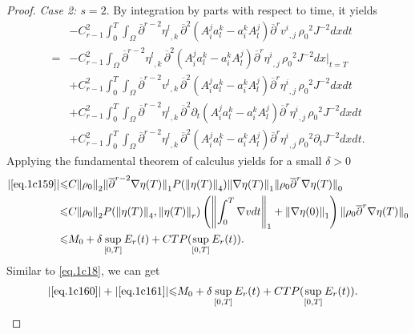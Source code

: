 \documentclass[12pt,twoside,reqno]{amsart}
\numberwithin{equation}{section}
\theoremstyle{definition}
\theoremstyle{remark}
\begin{document}
\begin{proof}
\emph{Case 2: $s=2$}. By integration by parts with respect to time, it yields
\begin{align}
  &-C_{r-1}^2{\int_0^T\!\!\!\!\int_\Omega }  {\overline{\partial}}^{r-2}{{{\eta^l}}_{,{k}}\,}{\overline{\partial}}^2(A^j_ia^k_l-a^k_iA^j_l){{{{\overline{\partial}}^r v^i}}_{,{j}}\,}{\rho_0}^2  J^{-2}dxdt\label{eq.1c158}\\
  =&-C_{r-1}^2\int_\Omega {\overline{\partial}}^{r-2}{{{\eta^l}}_{,{k}}\,}{\overline{\partial}}^2(A^j_ia^k_l-a^k_iA^j_l){{{{\overline{\partial}}^r \eta^i}}_{,{j}}\,}{\rho_0}^2  J^{-2}dx\Big|_{t=T}\label{eq.1c159}\\
  &+C_{r-1}^2{\int_0^T\!\!\!\!\int_\Omega }  {\overline{\partial}}^{r-2}{{{v^l}}_{,{k}}\,}{\overline{\partial}}^2(A^j_ia^k_l-a^k_iA^j_l){{{{\overline{\partial}}^r \eta^i}}_{,{j}}\,}{\rho_0}^2  J^{-2}dxdt\label{eq.1c160}\\
  &+C_{r-1}^2{\int_0^T\!\!\!\!\int_\Omega }  {\overline{\partial}}^{r-2}{{{\eta^l}}_{,{k}}\,}{\overline{\partial}}^2{\partial}_t(A^j_ia^k_l-a^k_iA^j_l){{{{\overline{\partial}}^r \eta^i}}_{,{j}}\,}{\rho_0}^2  J^{-2}dxdt\label{eq.1c161}\\
  &+C_{r-1}^2{\int_0^T\!\!\!\!\int_\Omega }  {\overline{\partial}}^{r-2}{{{\eta^l}}_{,{k}}\,}{\overline{\partial}}^2(A^j_ia^k_l-a^k_iA^j_l){{{{\overline{\partial}}^r \eta^i}}_{,{j}}\,}{\rho_0}^2  {\partial}_tJ^{-2}dxdt.\label{eq.1c162}
\end{align}
Applying the fundamental theorem of calculus yields for a small $\delta>0$
\begin{align*}
  {\vert{\eqref{eq.1c159}}\vert}{\leqslant} & C{\Vert{\rho_0}\Vert}_2{\Vert{{\overline{\partial}}^{r-2}{\nabla}\eta(T)}\Vert}_1P({\Vert{\eta(T)}\Vert}_4){\Vert{{\nabla}\eta(T)}\Vert}_1 {\Vert{{\rho_0} {\overline{\partial}}^r{\nabla}\eta(T)}\Vert}_0\\
  {\leqslant} &C{\Vert{\rho_0}\Vert}_2P({\Vert{\eta(T)}\Vert}_4,{\Vert{\eta(T)}\Vert}_r)\left({\left\Vert{\int_0^T{\nabla} v dt}\right\Vert}_1+{\Vert{{\nabla}\eta(0)}\Vert}_1\right) {\Vert{{\rho_0} {\overline{\partial}}^r{\nabla}\eta(T)}\Vert}_0\\
  {\leqslant} &M_0+\delta\sup_{[0,T]}E_r(t) +CTP(\sup_{[0,T]}E_r(t)).
\end{align*}
Similar to \eqref{eq.1c18}, we can get
\begin{align*}
  {\vert{\eqref{eq.1c160}}\vert}+{\vert{\eqref{eq.1c161}}\vert}{\leqslant}&M_0+\delta\sup_{[0,T]}E_r(t)+CT P(\sup_{[0,T]}E_r(t)).
\end{align*}


\end{proof}
\end{document}
